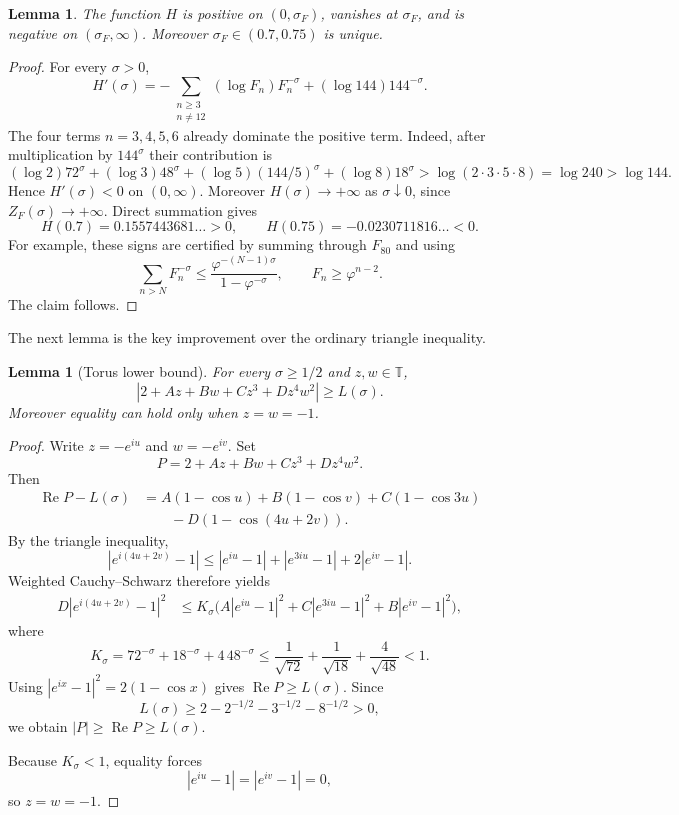 \documentclass[11pt]{article}
\newtheorem{lemma}[theorem]{Lemma}
\theoremstyle{remark}
\newcommand{\T}{\mathbb T}
\newcommand{\ZF}{Z_F}
\newcommand{\Ree}{\operatorname{Re}}
\begin{document}
\begin{lemma}\label{lem:H}
The function $H$ is positive on $(0,\sigma_F)$, vanishes at $\sigma_F$, and is negative on $(\sigma_F,\infty)$.  Moreover $\sigma_F\in(0.7,0.75)$ is unique.
\end{lemma}

\begin{proof}
For every $\sigma>0$,
\[
H'(\sigma)
=-\sum_{\substack{n\ge3\\ n\neq12}}(\log F_n)F_n^{-\sigma}
 +(\log144)144^{-\sigma}.
\]
The four terms $n=3,4,5,6$ already dominate the positive term.  Indeed, after multiplication by $144^\sigma$ their contribution is
\[
 (\log2)72^\sigma+(\log3)48^\sigma
 +(\log5)(144/5)^\sigma+(\log8)18^\sigma
 >\log(2\cdot3\cdot5\cdot8)=\log240>\log144.
\]
Hence $H'(\sigma)<0$ on $(0,\infty)$.  Moreover $H(\sigma)\to+\infty$ as $\sigma\downarrow0$, since $\ZF(\sigma)\to+\infty$.  Direct summation gives
\[
H(0.7)=0.1557443681\ldots>0,
\qquad
H(0.75)=-0.0230711816\ldots<0.
\]
For example, these signs are certified by summing through $F_{80}$ and using
\[
\sum_{n>N}F_n^{-\sigma}
\le \frac{\varphi^{-(N-1)\sigma}}{1-\varphi^{-\sigma}},
\qquad F_n\ge\varphi^{n-2}.
\]
The claim follows.
\end{proof}

The next lemma is the key improvement over the ordinary triangle inequality.

\begin{lemma}[Torus lower bound]\label{lem:torus}
For every $\sigma\ge1/2$ and $z,w\in\T$,
\begin{equation}\label{eq:torus-bound}
\left|2+Az+Bw+Cz^3+Dz^4w^2\right|\ge L(\sigma).
\end{equation}
Moreover equality can hold only when $z=w=-1$.
\end{lemma}

\begin{proof}
Write $z=-e^{iu}$ and $w=-e^{iv}$.  Set
\[
P=2+Az+Bw+Cz^3+Dz^4w^2.
\]
Then
\begin{align*}
\Ree P-L(\sigma)
&=A(1-\cos u)+B(1-\cos v)+C(1-\cos3u)\\
&\qquad-D(1-\cos(4u+2v)).
\end{align*}
By the triangle inequality,
\[
|e^{i(4u+2v)}-1|
\le |e^{iu}-1|+|e^{3iu}-1|+2|e^{iv}-1|.
\]
Weighted Cauchy--Schwarz therefore yields
\begin{align*}
D|e^{i(4u+2v)}-1|^2
&\le K_\sigma\bigl(
A|e^{iu}-1|^2+C|e^{3iu}-1|^2+B|e^{iv}-1|^2
\bigr),
\end{align*}
where
\[
K_\sigma=72^{-\sigma}+18^{-\sigma}+4\,48^{-\sigma}
\le \frac1{\sqrt{72}}+\frac1{\sqrt{18}}+\frac4{\sqrt{48}}<1.
\]
Using $|e^{ix}-1|^2=2(1-\cos x)$ gives $\Ree P\ge L(\sigma)$.  Since
\[
L(\sigma)\ge2-2^{-1/2}-3^{-1/2}-8^{-1/2}>0,
\]
we obtain $|P|\ge\Ree P\ge L(\sigma)$.

Because $K_\sigma<1$, equality forces
\[
|e^{iu}-1|=|e^{iv}-1|=0,
\]
so $z=w=-1$.
\end{proof}
\end{document}
